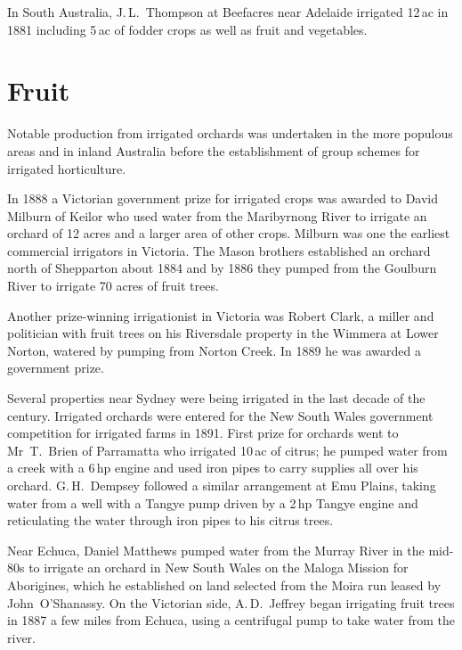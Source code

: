 In South Australia, J.\,L.~Thompson at Beefacres near Adelaide
irrigated 12\,ac in 1881 including 5\,ac of fodder crops as well as
fruit and vegetables.

\section*{Fruit}

Notable production from irrigated orchards was undertaken in the more
populous areas and in inland Australia before the establishment of
group schemes for irrigated horticulture.

In 1888 a Victorian government prize for irrigated crops was awarded
to David Milburn of Keilor who used water from the Maribyrnong River
to irrigate an orchard of 12 acres and a larger area of other
crops.  Milburn was one
the earliest commercial irrigators in Victoria.  The Mason brothers
established an orchard north of Shepparton about 1884 and by 1886 they
pumped from the Goulburn River to irrigate 70 acres of fruit
trees.

Another prize-winning irrigationist in Victoria was Robert Clark, a
miller and politician with fruit trees on his Riversdale property in
the Wimmera at Lower Norton, watered by pumping from Norton Creek.  In
1889 he was awarded a government prize.

Several properties near Sydney were being irrigated in the last decade
of the century.  Irrigated orchards were entered for the New South
Wales government competition for irrigated farms in 1891.  First prize
for orchards went to Mr~T.~Brien of Parramatta who irrigated 10\,ac of
citrus; he pumped water from a creek with a 6\,hp engine and used
iron pipes to carry supplies all over his orchard.  G.\,H.~Dempsey
followed a similar arrangement at Emu Plains, taking water from a well
with a Tangye pump driven by a 2\,hp Tangye engine and reticulating
the water through iron pipes to his citrus trees.

Near Echuca, Daniel Matthews pumped water from the Murray River in the
mid-80s to irrigate an orchard in New South Wales on the Maloga
Mission for Aborigines, which he established on land selected from the
Moira run leased by John~O'Shanassy.  On the Victorian side, A.\,D.~Jeffrey began
irrigating fruit trees in 1887 a few miles from Echuca, using a
centrifugal pump to take water from the river.

